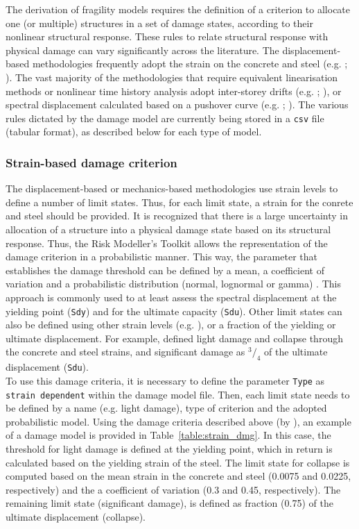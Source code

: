 The derivation of fragility models requires the definition of a criterion to allocate one (or multiple) structures in a set of damage states, according to their nonlinear structural response. These rules to relate structural response with physical damage can vary significantly across the literature. The displacement-based methodologies frequently adopt the strain on the concrete and steel (e.g. \cite{BorziEtAl2008b}; \cite{SilvaEtAl2013}). The vast majority of the methodologies that require equivalent linearisation methods or nonlinear time history analysis adopt inter-storey drifts (e.g. \cite{VamvatsikosCornell2005}; \cite{RossettoElnashai2005}), or spectral displacement calculated based on a pushover curve (e.g. \cite{Erberik2008}; \cite{SilvaEtAl2014c}). The various rules dictated by the damage model are currently being stored in a \verb=csv= file (tabular format), as described below for each type of model.

\subsubsection{Strain-based damage criterion}
\label{subsubsec:strain-dmg}
The displacement-based \citep{CrowleyEtAl2004} or mechanics-based \citep{BorziEtAl2008b} methodologies use strain levels to define a number of limit states. Thus, for each limit state, a strain for the conrete and steel should be provided. It is recognized that there is a large uncertainty in allocation of a structure into a physical damage state based on its structural response. Thus, the Risk Modeller's Toolkit allows the representation of the damage criterion in a probabilistic manner. This way, the parameter that establishes the damage threshold can be defined by a mean, a coefficient of variation and a probabilistic distribution (normal, lognormal or gamma) \citep{SilvaEtAl2013}. This approach is commonly used to at least assess the spectral displacement at the yielding point (\verb=Sdy=) and for the ultimate capacity (\verb=Sdu=). Other limit states can also be defined using other strain levels (e.g. \cite{CrowleyEtAl2004}), or a fraction of the yielding or ultimate displacement. For example, \cite{BorziEtAl2008b} defined light damage and collapse through the concrete and steel strains, and significant damage as $^3/_4$ of the ultimate displacement (\verb=Sdu=).\\

To use this damage criteria, it is necessary to define the parameter \verb=Type= as \verb=strain dependent= within the damage model file. Then, each limit state needs to be defined by a name (e.g. light damage), type of criterion and the adopted probabilistic model. Using the damage criteria described above (by \cite{BorziEtAl2008b}), an example of a damage model is provided in Table~\ref{table:strain_dmg}. In this case, the threshold for light damage is defined at the yielding point, which in return is calculated based on the yielding strain of the steel. The limit state for collapse is computed based on the mean strain in the concrete and steel (0.0075 and 0.0225, respectively) and the a coefficient of variation (0.3 and 0.45, respectively). The remaining limit state (significant damage), is defined as fraction (0.75) of the ultimate displacement (collapse).

